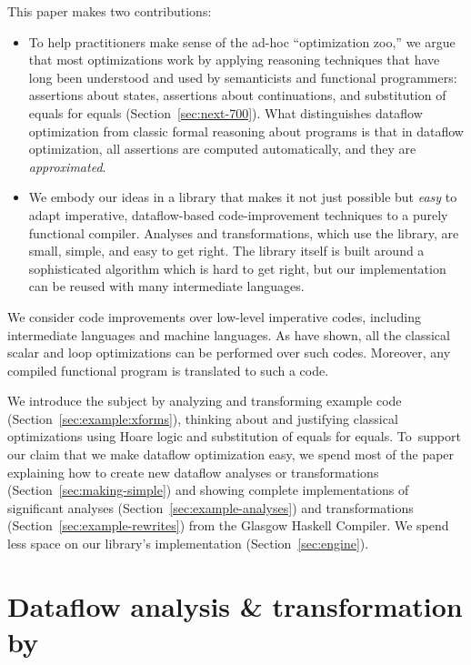 \documentclass[blockstyle,preprint,natbib,nocopyrightspace]{sigplanconf}
\newcommand\secref[1]{Section~\ref{sec:#1}}
\begin{document}
This paper makes two contributions:
\begin{itemize}
\item
To help practitioners make sense of the ad-hoc ``optimization zoo,''
we argue that most optimizations
work by applying reasoning techniques that have long been understood
and used 
by semanticists and functional programmers:
assertions about states, assertions about continuations, and
substitution of equals for equals (\secref{next-700}).
What distinguishes dataflow optimization from classic formal reasoning
about programs is that in dataflow optimization, all assertions are
computed automatically, and they are
\emph{approximated}. 
\item
We embody our ideas in a library that makes it not just
possible but \emph{easy} to adapt imperative, dataflow-based
code-improvement techniques to a purely functional compiler.
Analyses and transformations, which use the library,
are small, simple, and easy to get right.
The library itself
 is built around 
 a sophisticated algorithm which is
hard to get right, but our implementation
can be reused with many intermediate languages.
\end{itemize}

We consider code improvements over low-level
imperative codes, including intermediate languages and machine
languages.
As \citet{benitez-davidson:portable-optimizer} have shown, all the
classical scalar and loop optimizations can be performed over such
codes.
Moreover, any compiled functional program is
translated to such a code.


We introduce the subject by analyzing and transforming example code 
(\secref{example:xforms}),
thinking about and justifying classical optimizations using
Hoare logic and substitution of equals for equals.
To~support our claim that we make dataflow optimization easy, 
we spend most of the paper explaining how
to create new dataflow analyses or transformations
(\secref{making-simple}) and showing complete implementations of significant
analyses (\secref{example-analyses}) and transformations
(\secref{example-rewrites}) from the Glasgow Haskell Compiler.
We spend less space on our library's implementation (\secref{engine}).


\section{Dataflow analysis {\&} transformation by }
\end{document}
